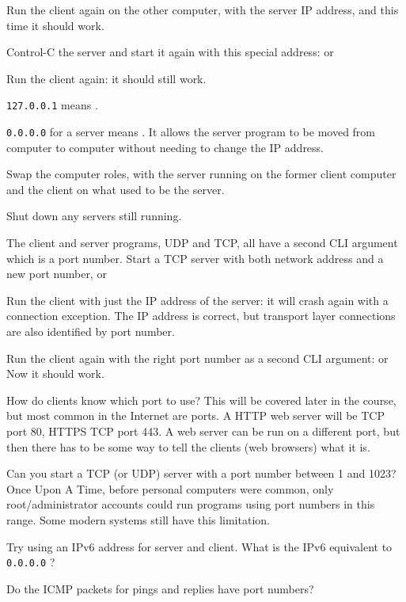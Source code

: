 Run the client again on the other computer, with the server IP address, and this time
it should work.

\STEP Control-C the server and start it again with this special address:
or

Run the client again: it should still work.

\begin{IMPORTANT}
\texttt{127.0.0.1} means .

\texttt{0.0.0.0} for a server means . It allows
the server program to be moved from computer to computer without needing to change the
IP address.
\end{IMPORTANT}

\STEP Swap the computer roles, with the server running on the former client computer and
the client on what used to be the server.



Shut down any servers still running.

\STEP The client and server programs, UDP and TCP, all have a second CLI argument which
is a port number. Start a TCP server with both network address and a new port number,
or

Run the client with just the IP address of the server: it will crash again with a
connection exception. The IP address is correct, but transport layer
connections are also identified by port number.

Run the client again with the right port number as a second CLI argument:
or
Now it should work.

How do clients know which port to use? This will be covered later in the course,
but most common in the Internet are  ports. A HTTP web server
will be TCP port 80, HTTPS TCP port 443.
A web server can be run on a different port, but then there has to be some way to
tell the clients (web browsers) what it is.



Can you start a TCP (or UDP) server with a port number between 1 and 1023?
Once Upon A Time, before personal computers were common, only root/administrator accounts
could run programs using port numbers in this range. Some modern systems still have this
limitation.

Try using an IPv6 address for server and client. What is the IPv6 equivalent
to \texttt{0.0.0.0} ?

Do the ICMP packets for pings and replies have port numbers?

\COPYRIGHT


